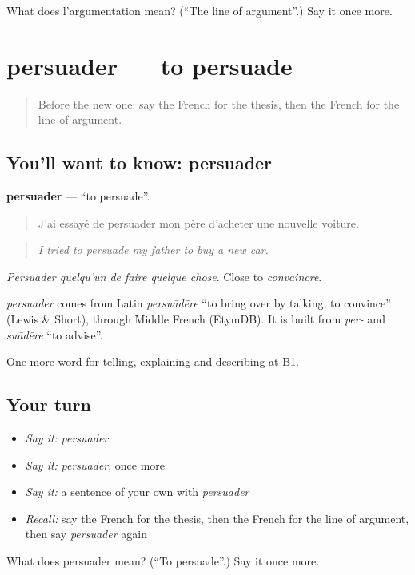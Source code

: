\begin{tcolorbox}[breakable,colback=teal!4,colframe=teal!35!black,title={Before you move on}]
What does l'argumentation mean? (\textquotedblleft{}The line of argument\textquotedblright{}.) Say it once more.
\end{tcolorbox}
\section[persuader]{persuader — to persuade}

\label{lesson:FR-C335-persuader}



\begin{quote}
Before the new one: say the French for the thesis, then the French for the line of argument.
\end{quote}

\subsection*{You'll want to know: persuader}
\textbf{persuader} — \textquotedblleft{}to persuade\textquotedblright{}.

\begin{quote}
J'ai essayé de persuader mon père d'acheter une nouvelle voiture.
\end{quote}

\begin{quote}
\emph{I tried to persuade my father to buy a new car.}
\end{quote}

\emph{Persuader quelqu'un de faire quelque chose}. Close to \emph{convaincre}.

\begin{cousinweb}
\emph{persuader} comes from Latin \emph{persuādēre} \textquotedblleft{}to bring over by talking, to convince\textquotedblright{} (Lewis \& Short), through Middle French (EtymDB). It is built from \emph{per-} and \emph{suādēre} \textquotedblleft{}to advise\textquotedblright{}.
\end{cousinweb}

\begin{grammarlens}[title={What you've built}]
One more word for telling, explaining and describing at B1.
\end{grammarlens}

\subsection*{Your turn}
\begin{itemize}
\raggedright
  \item \emph{Say it:} \emph{persuader}
  \item \emph{Say it:} \emph{persuader}, once more
  \item \emph{Say it:} a sentence of your own with \emph{persuader}
  \item \emph{Recall:} say the French for the thesis, then the French for the line of argument, then say \emph{persuader} again
\end{itemize}

\begin{tcolorbox}[breakable,colback=teal!4,colframe=teal!35!black,title={Before you move on}]
What does persuader mean? (\textquotedblleft{}To persuade\textquotedblright{}.) Say it once more.
\end{tcolorbox}
